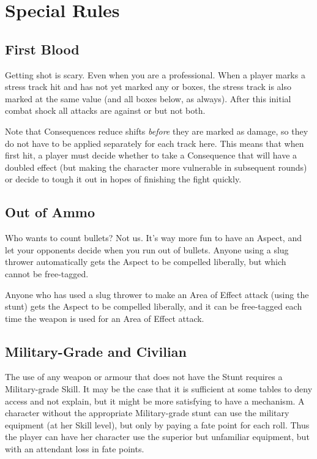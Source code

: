 \section{Special Rules}\label{sec:personal-combat-special-rules}

\subsection{First Blood}\label{sec:personal-combat-first-blood}

Getting shot is scary. Even when you are a professional. When a player marks a \Health{} stress track hit and has not yet marked any \Health{} or \Composure{} boxes, the \Composure{} stress track is also marked at the same value (and all boxes below, as always). After this initial combat shock all attacks are against \Health{} or \Composure{} but not both.

Note that Consequences reduce shifts \emph{before} they are marked as damage, so they do not have to be applied separately for each track here.  This means that when first hit, a player must decide whether to take a Consequence that will have a doubled effect (but making the character more vulnerable in subsequent rounds) or decide to tough it out in hopes of finishing the fight quickly.

\subsection{Out of Ammo}\label{sec:out-of-ammo}

Who wants to count bullets? Not us. It's way more fun to have an Aspect, and let your opponents decide when you run out of bullets. Anyone using a slug thrower automatically gets the Aspect  to be compelled liberally, but which cannot be free-tagged.

Anyone who has used a slug thrower to make an Area of Effect attack (using the  stunt) gets the Aspect  to be compelled liberally, and it can be free-tagged each time the weapon is used for an Area of Effect attack.

\subsection{Military-Grade and Civilian}
\label{sec:military-grade-and-civilian}

The use of any weapon or armour that does not have the  Stunt requires a Military-grade Skill. It may be the case that it is sufficient at some tables to deny access and not explain, but it might be more satisfying to have a mechanism. A character without the appropriate Military-grade stunt can use the military equipment (at her Skill level), but only by paying a fate point for each roll. Thus the player can have her character use the superior but unfamiliar equipment, but with an attendant loss in fate points.

